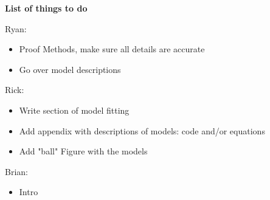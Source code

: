 \textbf{List of things to do}

Ryan:
\begin{itemize}
\item Proof Methods, make sure all details are accurate
\item Go over model descriptions
\end{itemize}
Rick:
\begin{itemize}
\item Write section of model fitting
\item Add appendix with descriptions of models: code and/or equations
\item Add "ball" Figure with the models
\end{itemize}

Brian:
\begin{itemize}
\item Intro
\end{itemize}
